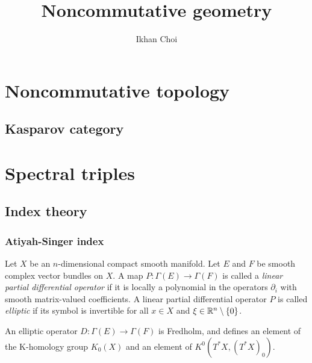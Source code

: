 \documentclass{../../large}
\begin{document}
\title{Noncommutative geometry}
\author{Ikhan Choi}
\maketitle
\tableofcontents



\part{Noncommutative topology}

\chapter{Kasparov category}

\section{}





\part{Spectral triples}

\chapter{Index theory}
\section{Atiyah-Singer index}

\begin{prb}
Let $X$ be an $n$-dimensional compact smooth manifold.
Let $E$ and $F$ be smooth complex vector bundles on $X$.
A map $P:\Gamma(E)\to\Gamma(F)$ is called a \emph{linear partial differential operator} if it is locally a polynomial in the operators $\partial_i$ with smooth matrix-valued coefficients.
A linear partial differential operator $P$ is called \emph{elliptic} if its symbol is invertible for all $x\in X$ and $\xi\in\mathbb{R}^n\setminus\{0\}$.
\begin{parts}
\item An elliptic operator $D:\Gamma(E)\to\Gamma(F)$ is Fredholm, and defines an element of the K-homology group $K_0(X)$ and an element of $K^0(T^*X,(T^*X)_0)$.
\end{parts}
\end{prb}
\end{document}
